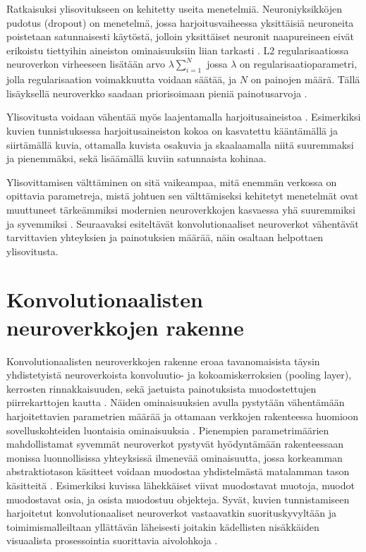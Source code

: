 \documentclass[finnish]{tktltiki2}
\theoremstyle{definition}
\theoremstyle{remark}
\begin{document}
    Ratkaisuksi ylisovitukseen on kehitetty useita menetelmiä. Neuroniyksikköjen pudotus (dropout) on menetelmä, jossa harjoitusvaiheessa yksittäisiä neuroneita poistetaan satunnaisesti käytöstä, jolloin yksittäiset neuronit naapureineen eivät erikoistu tiettyihin aineiston ominaisuuksiin liian tarkasti \cite{dropout-srivastava}. L2 regularisaatiossa neuroverkon virheeseen lisätään arvo $\lambda \sum_{i=1}^N$ jossa $\lambda$ on regularisaatioparametri, jolla regularisaation voimakkuutta voidaan säätää, ja $N$ on painojen määrä. Tällä lisäyksellä neuroverkko saadaan priorisoimaan pieniä painotusarvoja \cite{ng2004feature}.
    
    Ylisovitusta voidaan vähentää myös laajentamalla harjoitusaineistoa \cite{KSHimagenet2012}. Esimerkiksi kuvien tunnistuksessa harjoitusaineiston kokoa on kasvatettu kääntämällä ja siirtämällä kuvia, ottamalla kuvista osakuvia ja skaalaamalla niitä suuremmaksi ja pienemmäksi, sekä lisäämällä kuviin satunnaista kohinaa.

    Ylisovittamisen välttäminen on sitä vaikeampaa, mitä enemmän verkossa on opittavia parametreja, mistä johtuen sen välttämiseksi kehitetyt menetelmät ovat muuttuneet tärkeämmiksi modernien neuroverkkojen kasvaessa yhä suuremmiksi ja syvemmiksi \cite{SzegedyLJSRAEVR14}. Seuraavaksi esiteltävät konvolutionaaliset neuroverkot vähentävät tarvittavien yhteyksien ja painotuksien määrää, näin osaltaan helpottaen ylisovitusta.
    
  \section{Konvolutionaalisten neuroverkkojen rakenne}

    Konvolutionaalisten neuroverkkojen rakenne eroaa tavanomaisista täysin yhdistetyistä neuroverkoista konvoluutio- ja kokoamiskerroksien (pooling layer), kerrosten rinnakkaisuuden, sekä jaetuista painotuksista muodostettujen piirrekarttojen kautta \cite{Lecun-et-al-1989-convnets}. Näiden ominaisuuksien avulla pystytään vähentämään harjoitettavien parametrien määrää ja ottamaan verkkojen rakenteessa huomioon sovelluskohteiden luontaisia ominaisuuksia \cite{SzegedyLJSRAEVR14}. Pienempien parametrimäärien mahdollistamat syvemmät neuroverkot pystyvät hyödyntämään rakenteessaan monissa luonnollisissa yhteyksissä ilmenevää ominaisuutta, jossa korkeamman abstraktiotason käsitteet voidaan muodostaa yhdistelmästä matalamman tason käsitteitä \cite{nature-lecun15}. Esimerkiksi kuvissa lähekkäiset viivat muodostavat muotoja, muodot muodostavat osia, ja osista muodostuu objekteja. Syvät, kuvien tunnistamiseen harjoitetut konvolutionaaliset neuroverkot vastaavatkin suorituskyvyltään ja toimimismalleiltaan yllättävän läheisesti joitakin kädellisten nisäkkäiden visuaalista prosessointia suorittavia aivolohkoja \cite{deep-neural-rival-primate-cortex}.
    
\end{document}
